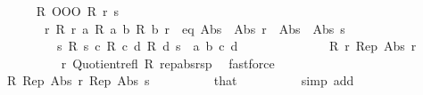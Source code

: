 \begin{isabellebody}
\ \ \ \ \isamarkupfalse%
\ {\isachardoublequoteopen}{\isacharparenleft}{\kern0pt}R{}\ OOO\ R{}{\isacharprime}{\kern0pt}{\isacharparenright}{\kern0pt}\ r\ s{\isachardoublequoteclose}\isanewline
\ \ \ \ \ \ \ r{\isacharcolon}{\kern0pt}\ {\isachardoublequoteopen}R{}\ r\ a{\isachardoublequoteclose}\ {\isachardoublequoteopen}R{}{\isacharprime}{\kern0pt}\ a\ b{\isachardoublequoteclose}\ {\isachardoublequoteopen}R{}\ b\ r{\isachardoublequoteclose}\ \ eq{\isacharcolon}{\kern0pt}\ {\isachardoublequoteopen}{\isacharparenleft}{\kern0pt}Abs{}\ {\isasymcirc}\ Abs{}{\isacharparenright}{\kern0pt}\ r\ {\isacharequal}{\kern0pt}\ {\isacharparenleft}{\kern0pt}Abs{}\ {\isasymcirc}\ Abs{}{\isacharparenright}{\kern0pt}\ s{\isachardoublequoteclose}\ \isanewline
\ \ \ \ \ \ \ \ \ s{\isacharcolon}{\kern0pt}\ {\isachardoublequoteopen}R{}\ s\ c{\isachardoublequoteclose}\ {\isachardoublequoteopen}R{}{\isacharprime}{\kern0pt}\ c\ d{\isachardoublequoteclose}\ {\isachardoublequoteopen}R{}\ d\ s{\isachardoublequoteclose}\ \ a\ b\ c\ d\isanewline
\ \ \ \ \isamarkupfalse%
\ {\isacharminus}{\kern0pt}\isanewline
\ \ \ \ \ \ \isamarkupfalse%
\ {\isachardoublequoteopen}R{}\ r\ {\isacharparenleft}{\kern0pt}Rep{}\ {\isacharparenleft}{\kern0pt}Abs{}\ r{\isacharparenright}{\kern0pt}{\isacharparenright}{\kern0pt}{\isachardoublequoteclose}\isanewline
\ \ \ \ \ \ \ \ \isamarkupfalse%
\ r\ Quotient{}{\isacharunderscore}{\kern0pt}refl{}\ R{}\ rep{\isacharunderscore}{\kern0pt}abs{\isacharunderscore}{\kern0pt}rsp\ \isamarkupfalse%
\ fastforce\isanewline
\ \ \ \ \ \ \isamarkupfalse%
\ \isamarkupfalse%
\ {\isachardoublequoteopen}R{}{\isacharprime}{\kern0pt}\ {\isacharparenleft}{\kern0pt}Rep{}\ {\isacharparenleft}{\kern0pt}Abs{}\ r{\isacharparenright}{\kern0pt}{\isacharparenright}{\kern0pt}\ {\isacharparenleft}{\kern0pt}Rep{}\ {\isacharparenleft}{\kern0pt}Abs{}\ s{\isacharparenright}{\kern0pt}{\isacharparenright}{\kern0pt}{\isachardoublequoteclose}\isanewline
\ \ \ \ \ \ \ \ \isamarkupfalse%
\ that\isanewline
\ \ \ \ \ \ \ \ \isamarkupfalse%
\ {\isacharparenleft}{\kern0pt}simp\ add{\isacharcolon}{\kern0pt}\ {\isacharparenright}{\kern0pt}\isanewline

\end{isabellebody}
